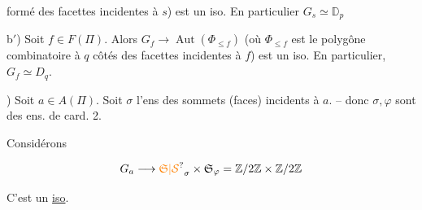 

formé des facettes incidentes à $s$) est un iso. En particulier $G_s\simeq\mathbb D_p$

b$'$) Soit $f\in F(\Pi)$. Alors $G_f\to\operatorname{Aut}(\Phi_{\leq f})$ (où $\Phi_{\leq f}$ est le polygône combinatoire à $q$ côtés des facettes incidentes à $f$) est un iso. En particulier, $G_f\simeq D_q$.

) Soit $a\in A(\Pi)$.  Soit $\sigma$ \inserted{($\varphi$)} l'ens des sommets (faces) incidents à $a$. -- donc $\sigma,\varphi$ sont des ens. de card. 2.

Considérons

\[
 G_a\longrightarrow\unsure{\mathfrak S|\mathcal S}_{\sigma}\times\mathfrak S_{\varphi}=\mathbb Z/2\mathbb Z\times\mathbb Z/2\mathbb Z
\]

C'est un \uline{iso}.



